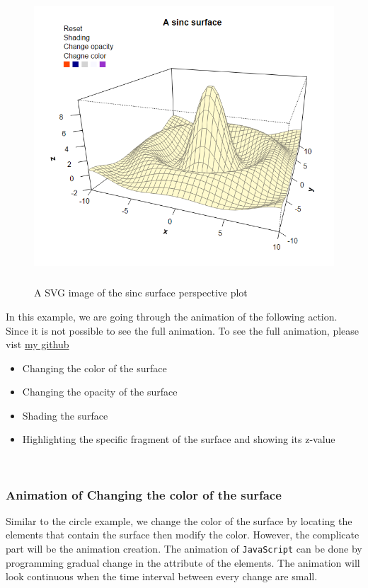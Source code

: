 \documentclass{report}
\begin{document}
\begin{figure}[h]
	\begin{center}
		\includegraphics[height = 11cm, width = 13cm]{figure/svg/origin_1.PNG}
		\caption{A SVG image of the sinc surface perspective plot}
		\label{Example_6.3.01}
	\end{center}
\end{figure}




In this example, we are going through the animation of the following action. Since it is not possible to see the full animation. To see the full animation, please vist \href{https://github.com/yeamin1/MasterProject/blob/master/report/svg}{my github}

\begin{itemize}
	\item Changing the color of the surface
	\item Changing the opacity of the surface
	\item Shading the surface
	\item Highlighting the specific fragment of the surface and showing its z-value  
\end{itemize}
\\

\subsubsection*{Animation of Changing the color of the surface}
Similar to the circle example, we change the color of the surface by locating the elements that contain the surface then modify the color. However, the complicate part will be the animation creation. The animation of \texttt{JavaScript} can be done by programming gradual change in the attribute of the elements. The animation will look continuous when the time interval between every change are small.\\
\end{document}
